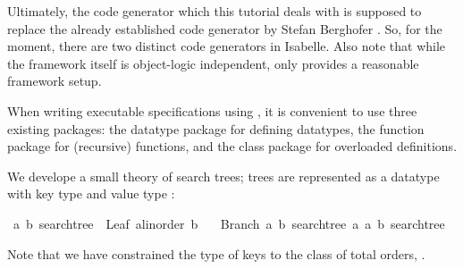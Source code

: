 \begin{isabellebody}
\begin{isamarkuptext}
  \begin{warn}
    Ultimately, the code generator which this tutorial deals with
    is supposed to replace the already established code generator
    by Stefan Berghofer \cite{Berghofer-Nipkow:2002}.
    So, for the moment, there are two distinct code generators
    in Isabelle.
    Also note that while the framework itself is
    object-logic independent, only  provides a reasonable
    framework setup.    
  \end{warn}%
\end{isamarkuptext}%
\isamarkuptrue%
%
\isamarkuptrue%
%
\begin{isamarkuptext}%
When writing executable specifications using ,
  it is convenient to use
  three existing packages: the datatype package for defining
  datatypes, the function package for (recursive) functions,
  and the class package for overloaded definitions.

  We develope a small theory of search trees; trees are represented
  as a datatype with key type  and value type :%
\end{isamarkuptext}%
\isamarkuptrue%
\isamarkupfalse%
\ {\isacharparenleft}{\isacharprime}a{\isacharcomma}\ {\isacharprime}b{\isacharparenright}\ searchtree\ {\isacharequal}\ Leaf\ {\isachardoublequoteopen}{\isacharprime}a{\isasymColon}linorder{\isachardoublequoteclose}\ {\isacharprime}b\isanewline
\ \ {\isacharbar}\ Branch\ {\isachardoublequoteopen}{\isacharparenleft}{\isacharprime}a{\isacharcomma}\ {\isacharprime}b{\isacharparenright}\ searchtree{\isachardoublequoteclose}\ {\isachardoublequoteopen}{\isacharprime}a{\isachardoublequoteclose}\ {\isachardoublequoteopen}{\isacharparenleft}{\isacharprime}a{\isacharcomma}\ {\isacharprime}b{\isacharparenright}\ searchtree{\isachardoublequoteclose}%
\begin{isamarkuptext}%
\noindent Note that we have constrained the type of keys
  to the class of total orders, .


\end{isamarkuptext}
\end{isabellebody}

